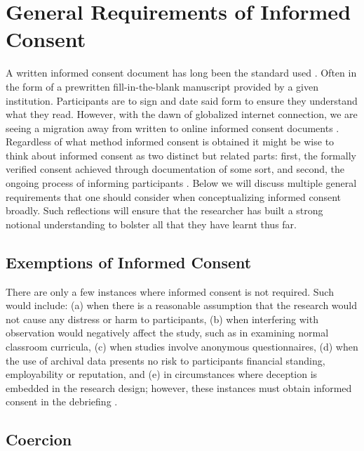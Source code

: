 \documentclass[
  11pt,
]{book}
\begin{document}
\section{General Requirements of Informed Consent}\label{general-requirements-of-informed-consent}

A written informed consent document has long been the standard used \citep{rothwell_informed_2021}. Often in the form of a prewritten fill-in-the-blank manuscript provided by a given institution. Participants are to sign and date said form to ensure they understand what they read. However, with the dawn of globalized internet connection, we are seeing a migration away from written to online informed consent documents \citep{rothwell_informed_2021, salmons_doing_2016}. Regardless of what method informed consent is obtained it might be wise to think about informed consent as two distinct but related parts: first, the formally verified consent achieved through documentation of some sort, and second, the ongoing process of informing participants \citep{salmons_doing_2016}. Below we will discuss multiple general requirements that one should consider when conceptualizing informed consent broadly. Such reflections will ensure that the researcher has built a strong notional understanding to bolster all that they have learnt thus far.

\subsection{Exemptions of Informed Consent}\label{exemptions-of-informed-consent}

There are only a few instances where informed consent is not required. Such would include: (a) when there is a reasonable assumption that the research would not cause any distress or harm to participants, (b) when interfering with observation would negatively affect the study, such as in examining normal classroom curricula, (c) when studies involve anonymous questionnaires, (d) when the use of archival data presents no risk to participants financial standing, employability or reputation, and (e) in circumstances where deception is embedded in the research design; however, these instances must obtain informed consent in the debriefing \citep[Section 8.03]{american_psychological_association_ethical_2017}.

\subsection{Coercion}\label{coercion}
\end{document}
